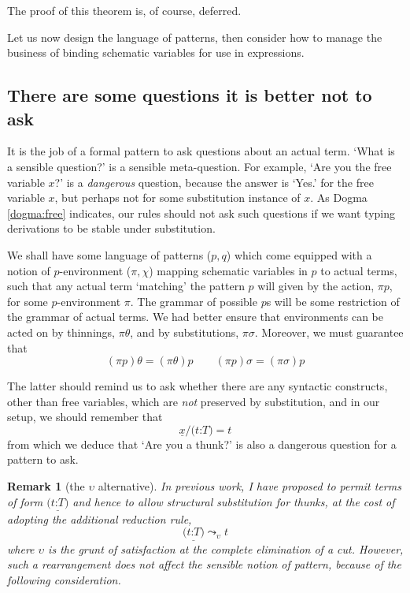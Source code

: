 \documentclass{jfp1}
\newtheorem{remark}[theorem]{Remark}
\newcommand{\fsl}{\texttt{/}}
\newcommand{\Pa}[1]{\texttt{(}#1\texttt{)}}
\newcommand{\hb}{\texttt{:}}
\newcommand{\ra}[2]{\Pa{#1 \hb #2}}
\newcommand{\Ne}{\underline}
\begin{document}
The proof of this theorem is, of course, deferred.

Let us now design the language of patterns, then consider how to
manage the business of binding schematic variables for use in
expressions.


\subsection{There are some questions it is better not to ask}

It is the job of a formal pattern to ask questions about an actual
term. `What is a sensible question?' is a sensible meta-question.
For example, `Are you the free variable $x$?' is a \emph{dangerous}
question, because the answer is `Yes.' for the free variable $x$, but
perhaps not for some substitution instance of $x$. As Dogma
\ref{dogma:free} indicates, our rules should not ask such questions if
we want typing derivations to be stable under substitution.

We shall have some language of patterns ($p,q$) which come equipped with a
notion of $p$-environment ($\pi,\chi$) mapping schematic variables in
$p$ to actual terms, such that any actual term `matching' the pattern
$p$ will given by the action, $\pi p$, for some $p$-environment $\pi$. The grammar of
possible $p$s will be some restriction of the grammar of actual terms.
We had better ensure that environments can be acted on by thinnings,
$\pi\theta$, and by substitutions, $\pi\sigma$. Moreover, we must
guarantee that
\[
  (\pi p)\theta = (\pi\theta)p\qquad
  (\pi p)\sigma = (\pi\sigma)p
\]

The latter should remind us to ask whether there are any syntactic
constructs, other than free variables, which are \emph{not} preserved
by substitution, and in our setup, we should remember that
\[
  \Ne x\fsl\ra tT = t
\]
from which we deduce that `Are you a thunk?' is also a dangerous
question for a pattern to ask.

\begin{remark}[the $\upsilon$ alternative]
  In previous work, I have proposed to permit terms of form $\Ne{\ra
    tT}$ and hence to allow structural substitution for thunks, at the
  cost of adopting the additional reduction rule,
  \[
    \Ne{\ra tT} \leadsto_\upsilon t
  \]
  where $\upsilon$ is the grunt of satisfaction at the complete
  elimination of a cut. However, such a rearrangement does not
  affect the sensible notion of pattern, because of the following
  consideration.
\end{remark}
\end{document}

